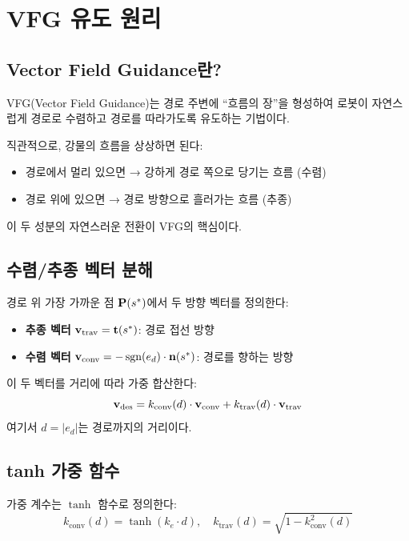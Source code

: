 \section{VFG 유도 원리}
\label{sec:vfg}

\subsection{Vector Field Guidance란?}

VFG(Vector Field Guidance)는 경로 주변에 ``흐름의 장''을 형성하여
로봇이 자연스럽게 경로로 수렴하고 경로를 따라가도록 유도하는 기법이다.

직관적으로, 강물의 흐름을 상상하면 된다:
\begin{itemize}[nosep]
    \item 경로에서 멀리 있으면 → 강하게 경로 쪽으로 당기는 흐름 (수렴)
    \item 경로 위에 있으면 → 경로 방향으로 흘러가는 흐름 (추종)
\end{itemize}

이 두 성분의 자연스러운 전환이 VFG의 핵심이다.

\subsection{수렴/추종 벡터 분해}

경로 위 가장 가까운 점 $\mathbf{P}(s^*)$에서 두 방향 벡터를 정의한다:
\begin{itemize}[nosep]
    \item \textbf{추종 벡터} $\mathbf{v}_\text{trav} = \mathbf{t}(s^*)$: 경로 접선 방향
    \item \textbf{수렴 벡터} $\mathbf{v}_\text{conv} = -\operatorname{sgn}(e_d) \cdot \mathbf{n}(s^*)$: 경로를 향하는 방향
\end{itemize}

이 두 벡터를 거리에 따라 가중 합산한다:
\begin{equation}
    \mathbf{v}_\text{des} = k_\text{conv}(d) \cdot \mathbf{v}_\text{conv} + k_\text{trav}(d) \cdot \mathbf{v}_\text{trav}
    \label{eq:vfg}
\end{equation}
여기서 $d = |e_d|$는 경로까지의 거리이다.

\subsection{tanh 가중 함수}

가중 계수는 $\tanh$ 함수로 정의한다:
\begin{equation}
    k_\text{conv}(d) = \tanh(k_e \cdot d), \quad
    k_\text{trav}(d) = \sqrt{1 - k_\text{conv}^2(d)}
    \label{eq:weights}
\end{equation}

